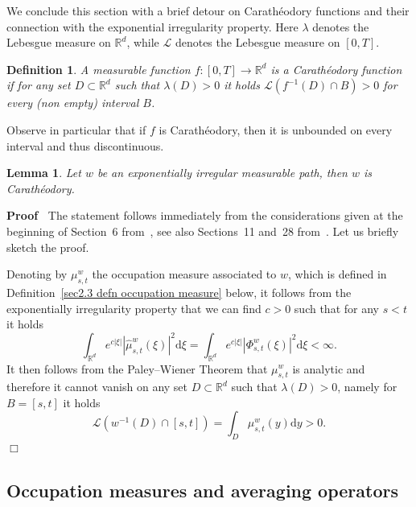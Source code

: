 \documentclass[10pt]{article}
\newcommand{\mathd}{\mathrm{d}}
\newenvironment{proof}{\noindent\textbf{Proof\ }}{\hspace*{\fill}$\Box$\medskip}
\newtheorem{definition}[theorem]{Definition}
\newtheorem{lemma}[theorem]{Lemma}
\begin{document}
We conclude this section with a brief detour on Carath{\'e}odory functions and
their connection with the exponential irregularity property. Here $\lambda$
denotes the Lebesgue measure on $\mathbb{R}^d$, while $\mathcal{L}$ denotes
the Lebesgue measure on $[0, T]$.

\begin{definition}
  \label{sec2.2 defn charatheodory}A measurable function $f : [0, T]
  \rightarrow \mathbb{R}^d$ is a Carath{\'e}odory function if for any set $D
  \subset \mathbb{R}^d$ such that $\lambda (D) > 0$ it holds $\mathcal{L}
  (f^{- 1} (D) \cap B) > 0$ for every (non empty) interval $B$.
\end{definition}

Observe in particular that if $f$ is Carath{\'e}odory, then it is unbounded on
every interval and thus discontinuous.

\begin{lemma}
  \label{sec2.2 exp implies charatheodory}Let $w$ be an exponentially
  irregular measurable path, then $w$ is Carath{\'e}odory.
\end{lemma}

\begin{proof}
  The statement follows immediately from the considerations given at the
  beginning of Section~6 from~{\cite{berman69}}, see also Sections~11 and~28
  from~{\cite{geman}}. Let us briefly sketch the proof.
  
  Denoting by $\mu_{s, t}^w$ the occupation measure associated to $w$, which
  is defined in Definition~\ref{sec2.3 defn occupation measure} below, it
  follows from the exponentially irregularity property that we can find $c >
  0$ such that for any $s < t$ it holds
  \[ \int_{\mathbb{R}^d} e^{c | \xi |} | \hat{\mu}_{s, t}^w (\xi) |^2 \mathd
     \xi = \int_{\mathbb{R}^d} e^{c | \xi |} | \Phi^w_{s, t} (\xi) |^2 \mathd
     \xi < \infty . \]
  It then follows from the Paley--Wiener Theorem that $\mu^w_{s, t}$ is
  analytic and therefore it cannot vanish on any set $D \subset \mathbb{R}^d$
  such that $\lambda (D) > 0$, namely for $B = [s, t]$ it holds
  \[ \mathcal{L} (w^{- 1} (D) \cap [s, t]) = \int_D \mu_{s, t}^w (y) \mathd y
     > 0. \]
\end{proof}

\subsection{Occupation measures and averaging operators}\label{sec2.3}
\end{document}
